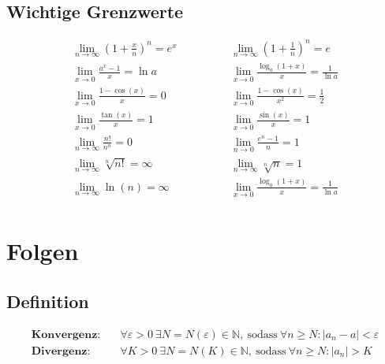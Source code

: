 \documentclass[11pt]{article}
\begin{document}
\subsection{Wichtige Grenzwerte}

\begin{equation*}
\begin{split}
	\lim\limits_{n \to \infty} \left( 1+\frac{x}{n} \right)^n = e^x \qquad & \qquad \lim\limits_{n \to \infty} \left( 1+\frac{1}{n} \right)^n = e \\
	\lim\limits_{x \to 0} \frac{a^x-1}{x} = \ln a \qquad & \qquad \lim\limits_{x \to 0} \frac{\log_a(1+x)}{x} = \frac{1}{\ln a} \\
	\lim\limits_{x \to 0} \frac{1-\cos(x)}{x} = 0 \quad \qquad & \qquad \lim\limits_{x \to 0} \frac{1-\cos(x)}{x^2} = \frac{1}{2} \\
	\lim\limits_{x \to 0} \frac{\tan(x)}{x} = 1 \qquad & \qquad \lim\limits_{x \to 0} \frac{\sin(x)}{x} = 1 \\
	\lim\limits_{n \to \infty} \frac{n!}{n^n} = 0 \qquad & \qquad \lim\limits_{n \to 0} \frac{e^n -1 }{n} = 1 \\
	\lim\limits_{n \to \infty} \sqrt[n]{n!} = \infty \qquad & \qquad \lim\limits_{n \to \infty} \sqrt[n]{n} = 1 \\
	\lim\limits_{n \to \infty} \ln(n) = \infty \qquad & \qquad \lim\limits_{x \to 0} \frac{\log_a(1+x)}{x} = \frac{1}{\ln a} \\
\end{split}
\end{equation*}

\section{Folgen}

\subsection{Definition}

\begin{equation*}
\begin{split}
	\textbf{Konvergenz:} \quad & \forall \varepsilon > 0\ \exists N = N(\varepsilon) \in \mathbb{N},\ \text{sodass}\ \forall n \geq N: |a_n - a| < \varepsilon \\
	\textbf{Divergenz:} \quad & \forall K > 0\ \exists N = N(K) \in \mathbb{N},\ \text{sodass}\ \forall n \geq N: |a_n| > K
\end{split}
\end{equation*}
\end{document}
